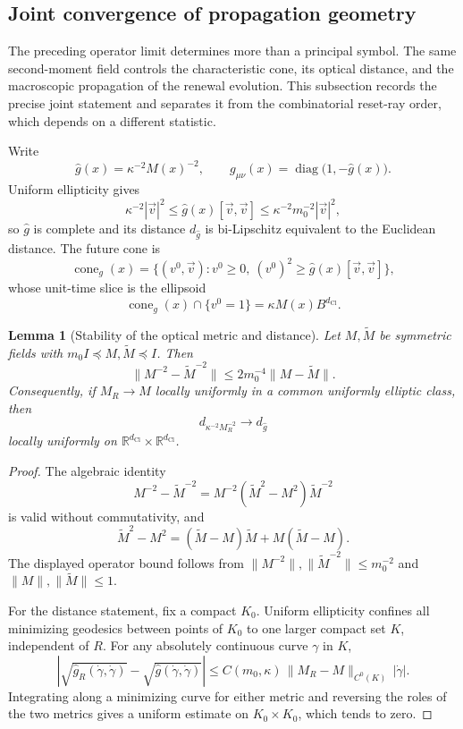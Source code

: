 \documentclass[11pt]{article}
\newtheorem{lemma}[theorem]{Lemma}
\theoremstyle{definition}
\theoremstyle{remark}
\newcommand{\R}{\mathbb{R}}
\newcommand{\dCl}{d_{\mathrm{Cl}}}
\newcommand{\cone}{\operatorname{cone}}
\newcommand{\diag}{\operatorname{diag}}
\newcommand{\norm}[1]{\lVert#1\rVert}
\begin{document}
\subsection{Joint convergence of propagation geometry}
\label{sec:joint-propagation-geometry}

The preceding operator limit determines more than a principal symbol.  The same
second-moment field controls the characteristic cone, its optical distance, and
the macroscopic propagation of the renewal evolution.  This subsection records
the precise joint statement and separates it from the combinatorial
reset-ray order, which depends on a different statistic.

Write
\[
  \widehat g(x)=\kappa^{-2}M(x)^{-2},
  \qquad
  g_{\mu\nu}(x)=\diag\bigl(1,-\widehat g(x)\bigr).
\]
Uniform ellipticity gives
\[
  \kappa^{-2}|\vec v|^2
  \le \widehat g(x)[\vec v,\vec v]
  \le \kappa^{-2}m_0^{-2}|\vec v|^2,
\]
so \(\widehat g\) is complete and its distance \(d_{\widehat g}\) is
bi-Lipschitz equivalent to the Euclidean distance.  The future cone is
\[
  \cone_g(x)
  =\{(v^0,\vec v):v^0\ge0,\ (v^0)^2\ge
    \widehat g(x)[\vec v,\vec v]\},
\]
whose unit-time slice is the ellipsoid
\[
  \cone_g(x)\cap\{v^0=1\}=\kappa M(x)B^{\dCl}.
\]

\begin{lemma}[Stability of the optical metric and distance]
\label{lem:optical-distance-stability}
Let \(M,\widetilde M\) be symmetric fields with
\(m_0I\preceq M,\widetilde M\preceq I\).  Then
\[
 \norm{M^{-2}-\widetilde M^{-2}}
 \le 2m_0^{-4}\norm{M-\widetilde M}.
\]
Consequently, if \(M_R\to M\) locally uniformly in a common uniformly elliptic
class, then
\[
 d_{\kappa^{-2}M_R^{-2}}\longrightarrow d_{\widehat g}
\]
locally uniformly on \(\R^{\dCl}\times\R^{\dCl}\).
\end{lemma}

\begin{proof}
The algebraic identity
\[
 M^{-2}-\widetilde M^{-2}
 =M^{-2}(\widetilde M^2-M^2)\widetilde M^{-2}
\]
is valid without commutativity, and
\[
 \widetilde M^2-M^2
 =(\widetilde M-M)\widetilde M+M(\widetilde M-M).
\]
The displayed operator bound follows from
\(\norm{M^{-2}},\norm{\widetilde M^{-2}}\le m_0^{-2}\) and
\(\norm{M},\norm{\widetilde M}\le1\).

For the distance statement, fix a compact \(K_0\).  Uniform ellipticity confines
all minimizing geodesics between points of \(K_0\) to one larger compact set
\(K\), independent of \(R\).  For any absolutely continuous curve \(\gamma\)
in \(K\),
\[
 \left|\sqrt{\widehat g_R(\dot\gamma,\dot\gamma)}
       -\sqrt{\widehat g(\dot\gamma,\dot\gamma)}\right|
 \le C(m_0,\kappa)\,
      \norm{M_R-M}_{C^0(K)}\,|\dot\gamma|.
\]
Integrating along a minimizing curve for either metric and reversing the roles
of the two metrics gives a uniform estimate on \(K_0\times K_0\), which tends
to zero.
\end{proof}
\end{document}

